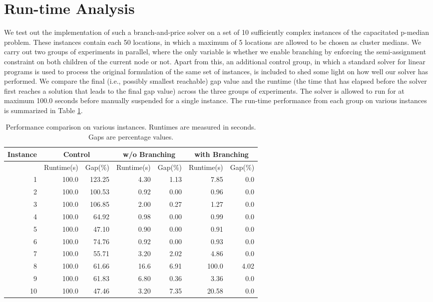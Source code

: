 \documentclass[
	11pt,
	DIV10,
	ngerman,
	a4paper,
	oneside,
	headings=normal,
	captions=tableheading,
	final,
	numbers=noenddot
]{scrartcl}
\begin{document}
\section{Run-time Analysis}
\label{sec2}

We test out the implementation of such a branch-and-price solver on a set of 10 sufficiently complex instances of the capacitated p-median problem. These instances contain each 50 locations, in which a maximum of 5 locations are allowed to be chosen as cluster medians. We carry out two groups of experiments in parallel, where the only variable is whether we enable branching by enforcing the semi-assignment constraint on both children of the current node or not. Apart from this, an additional control group, in which a standard solver for linear programs is used to process the original formulation of the same set of instances, is included to shed some light on how well our solver has performed. We compare the final (i.e., possibly smallest reachable) gap value and the runtime (the time that has elapsed before the solver first reaches a solution that leads to the final gap value) across the three groups of experiments. The solver is allowed to run for at maximum 100.0 seconds before manually suspended for a single instance. The run-time performance from each group on various instances is summarized in Table \ref{table1}.

\begin{table}[tb]
	\centering
	\begin{tabular}{|r|r|r|r|r|r|r|}
		\hline
		Instance & \multicolumn{2}{c|}{Control} & \multicolumn{2}{c|}{w/o Branching} & \multicolumn{2}{c|}{with Branching} \\
		\hline
		& Runtime(s) & Gap(\%) & Runtime(s) & Gap(\%) & Runtime(s) & Gap(\%) \\
		\hline
		1 & 100.0 & 123.25 & 4.30 & 1.13 & 7.85 & 0.0 \\
		2 & 100.0 & 100.53 & 0.92 & 0.00 & 0.96 & 0.0 \\
		3 & 100.0 & 106.85 & 2.00 & 0.27 & 1.27 & 0.0 \\
		4 & 100.0 & 64.92 & 0.98 & 0.00 & 0.99 & 0.0 \\
		5 & 100.0 & 47.10 & 0.90 & 0.00 & 0.91 & 0.0 \\
		6 & 100.0 & 74.76 & 0.92 & 0.00 & 0.93 & 0.0 \\
		7 & 100.0 & 55.71 & 3.20 & 2.02 & 4.86 & 0.0 \\
		8 & 100.0 & 61.66 & 16.6 & 6.91 & 100.0 & 4.02 \\
		9 & 100.0 & 61.83 & 6.80 & 0.36 & 3.36 & 0.0 \\
		10 & 100.0 & 47.46 & 3.20 & 7.35 & 20.58 & 0.0 \\
		\hline
	\end{tabular}
	\caption{\label{table1} Performance comparison on various instances. Runtimes are measured in seconds. Gaps are percentage values.}
\end{table}
\end{document}
